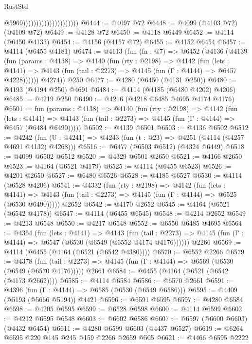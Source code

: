 \begin{lexlean}{RustStd}
\begin{coremodule}
                                              @5969)))))))))))))))))))))
@6444 := @4097 @72
@6448 := @4099 (@4103 @72) (@4109 @72)
@6449 := @4128 @72
@6450 := @4118 @6449
@6452 := @4114 (@6450 @4133)
@6454 := @4156 (@4157 @72)
@6455 := @4152 @6454
@6457 := @4114 (@6455 @4181)
@6474 := @4113
    (fun (fn : @7) =>
    @6452
      (@4136
        (@4139
          (fun (params : @4138) =>
          @4140
            (fun (rty : @2198) =>
            @4142
              (fun (lets : @4141) =>
              @4143 (fun (tail : @2273) => @4145 (fun (Γ : @4144) => @6457 @4228))))))
        @4274))
    @250
@6477 := @4280 (@6450 (@4131 @250))
@6480 := @4193 (@4194 @250) @4691
@6484 := @4114 (@4185 (@6480 @4202) @4206)
@6485 := @4219 @250
@6490 := @4216 (@4218 @6485 @4695 @4174 @4176)
@6501 := fun (params : @4138) =>
  @4140
    (fun (rty : @2198) =>
    @4142
      (fun (lets : @4141) =>
      @4143 (fun (tail : @2273) => @4145 (fun (Γ : @4144) => @6457 (@6484 @6490)))))
@6502 := @4139 @6501
@6503 := @4136 @6502
@6512 := @4242 (fun (U : @4241) => @4243 (fun (t : @23) => @4251 (@4114 (@4257 @4691 @4132) @4268)))
@6516 := @6477 (@6503 @6512) (@4324 @6449)
@6518 := @4099 @6502 @6512
@6520 := @4329 @6501 @2650
@6521 := @4166 @2650
@6523 := @4164 (@6521 @4179)
@6525 := @4114 (@6455 @6523)
@6526 := @4201 @2650
@6527 := @6480 @6526
@6528 := @4185 @6527
@6530 := @4114 (@6528 @4206)
@6541 := @4332
    (fun (rty : @2198) =>
    @4142
      (fun (lets : @4141) =>
      @4143 (fun (tail : @2273) => @4145 (fun (Γ : @4144) => @6525 (@6530 @6490)))))
    @2652
@6542 := @4170 @2652
@6545 := @4164 (@6521 (@6542 @4178))
@6547 := @4114 (@6455 @6545)
@6548 := @4214 @2652
@6549 := @4213 @6548
@6550 := @4217 @6548
@6552 := @6550 @6485 @4695
@6564 := @4354
    (fun (lets : @4141) =>
    @4143
      (fun (tail : @2273) => @4145 (fun (Γ : @4144) => @6547 (@6530 (@6549 (@6552 @4174 @4176))))))
    @2266
@6569 := @4114 (@6455 (@4164 (@6521 (@6542 @4380))))
@6570 := @6552 @2266
@6579 := @4378
    (fun (tail : @2273) => @4145 (fun (Γ : @4144) => @6569 (@6530 (@6549 (@6570 @4176)))))
    @2661
@6584 := @6455 (@4164 (@6521 (@6542 (@4173 @2662))))
@6585 := @4114 @6584
@6586 := @6570 @2661
@6591 := @4396 (fun (Γ : @4144) => @6585 (@6530 (@6549 @6586)))
@6595 := @4409 (@5193 (@5666 @5194)) @4421
@6596 := @6591 @6595
@6597 := @4280 @6584
@6598 := @4205 @6595
@6599 := @6528 @6598
@6600 := @4114 @6599
@6602 := @4212 @6595 @6548
@6603 := @6602 @6586
@6607 := @6597 (@6600 @6603) (@4432 @6454)
@6611 := @4280 @6599 @6603 (@4437 @6527)
@6619 := @6264 @6595 @220 @145 @245 @159 @2266 @2659 @505
@6621 := @4466 @6595 @2222

\end{coremodule}
\end{lexlean}
